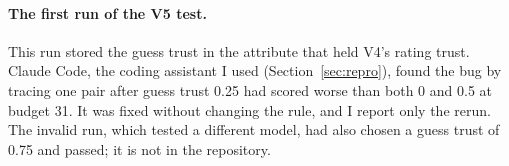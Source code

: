 \paragraph{The first run of the V5 test.}
This run stored the guess trust in the attribute that held V4's rating trust. Claude Code, the coding assistant I used (Section~\ref{sec:repro}), found the bug by tracing one pair after guess trust 0.25 had scored worse than both 0 and 0.5 at budget 31. It was fixed without changing the rule, and I report only the rerun. The invalid run, which tested a different model, had also chosen a guess trust of 0.75 and passed; it is not in the repository.
